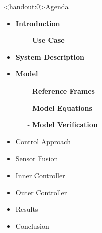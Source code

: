 
\begin{frame}<handout:0>{Agenda}{}
    \begin{itemize}
        \item \textcolor{aaublue}{\textbf{Introduction}}
        \begin{itemize}
            \item[-] \textcolor{aaublue}{\textbf{Use Case}}
        \end{itemize}
        \item \textcolor{aaublue}{\textbf{System Description}}
        \item \textcolor{aaublue}{\textbf{Model}}
        \begin{itemize}
             \item[-] \textcolor{aaublue}{\textbf{Reference Frames}}
             \item[-] \textcolor{aaublue}{\textbf{Model Equations}}
             \item[-] \textcolor{aaublue}{\textbf{Model Verification}}
        \end{itemize}
        \item Control Approach
        \item Sensor Fusion
        \item Inner Controller
        \item Outer Controller
        \item Results
        \item Conclusion
    \end{itemize}
\end{frame}